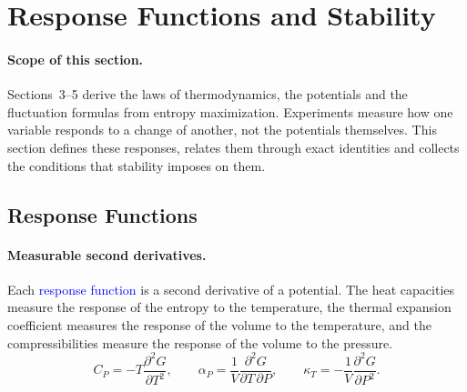 
\section{Response Functions and Stability}

\paragraph{Scope of this section.}
Sections~3--5 derive the laws of thermodynamics, the potentials and the
fluctuation formulas from entropy maximization. Experiments measure how one
variable responds to a change of another, not the potentials themselves.
This section defines these responses, relates them through exact identities
and collects the conditions that stability imposes on them.

\subsection{Response Functions}

\paragraph{Measurable second derivatives.}
Each \textcolor{blue}{response function} is a second derivative of a
potential. The heat capacities measure the response of the entropy to the
temperature, the thermal expansion coefficient measures the response of the
volume to the temperature, and the compressibilities measure the response
of the volume to the pressure.
\begin{equation}
    \boxed{C_P=-T\frac{\partial^2G}{\partial T^2},\qquad
    \alpha_P=\frac{1}{V}\frac{\partial^2G}{\partial T\,\partial P},\qquad
    \kappa_T=-\frac{1}{V}\frac{\partial^2G}{\partial P^2}.}
\end{equation}

